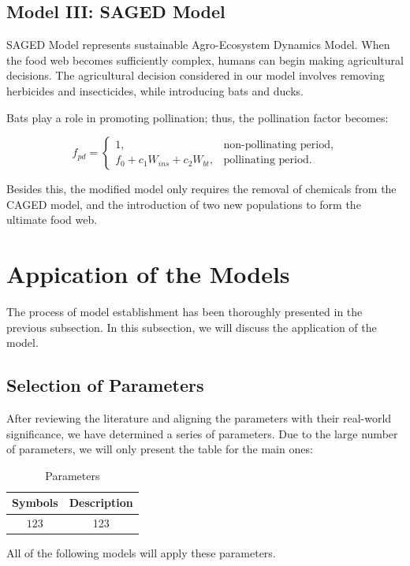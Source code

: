 \documentclass{HZNUMCM}
\begin{document}
    \subsection{Model III: SAGED Model}
      SAGED Model represents sustainable Agro-Ecosystem Dynamics Model.
      When the food web becomes sufficiently complex, humans can begin making agricultural decisions. The agricultural decision considered in our model involves removing herbicides and insecticides, while introducing bats and ducks.

      Bats play a role in promoting pollination; thus, the pollination factor becomes:
      
      \[
      f_{pd} = \begin{cases}
      1, & \text{non-pollinating period}, \\
      f_0 + c_1 W_{ins} + c_2 W_{bt}, & \text{pollinating period}.
      \end{cases}
      \]
      
      Besides this, the modified model only requires the removal of chemicals from the CAGED model, and the introduction of two new populations to form the ultimate food web.

  \section{Appication of the Models}
    The process of model establishment has been thoroughly presented in the previous subsection. 
    In this subsection, we will discuss the application of the model.
    \subsection{Selection of Parameters}
      After reviewing the literature and aligning the parameters with their real-world significance, 
      we have determined a series of parameters. Due to the large number of parameters, 
      we will only present the table for the main ones:
      \begin{table}[H]
        \centering
        \caption{Parameters}
        \begin{tabular}{cc}
          \toprule
          \rowcolor{customcolor!40} %
          Symbols & Description\\
          \midrule
          $123$ & 123\\
          \bottomrule
        \end{tabular}
        \label{tab:Parameters}
      \end{table}
      All of the following models will apply these parameters.
\end{document}
